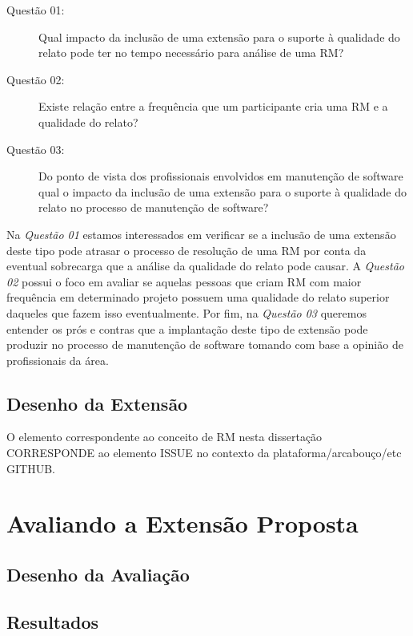 \begin{description}
	\item[Questão 01:] Qual impacto da inclusão de uma extensão para o suporte à
		qualidade do relato pode ter no tempo necessário para análise de uma
		RM\@?
	\item[Questão 02:] Existe relação entre a frequência que um participante
		cria uma RM e a qualidade do relato?
	\item[Questão 03:] Do ponto de vista dos profissionais envolvidos em
		manutenção de software qual o impacto da inclusão de uma extensão para o
		suporte à qualidade do relato no processo de manutenção de software?
\end{description}

Na \textit{Questão 01} estamos interessados em verificar se a inclusão de uma
extensão deste tipo pode atrasar o processo de resolução de uma RM por conta da
eventual sobrecarga que a análise da qualidade do relato pode causar. A
\textit{Questão 02} possui o foco em avaliar se aquelas pessoas que criam RM com
maior frequência em determinado projeto possuem uma qualidade do relato superior
daqueles que fazem isso eventualmente. Por fim, na \textit{Questão 03} queremos
entender os prós e contras que a implantação deste tipo de extensão pode
produzir no processo de manutenção de software tomando com base a opinião de
profissionais da área.

\subsection{Desenho da Extensão}
\label{sub:desenho_da_extensao}


O elemento correspondente ao conceito de RM nesta dissertação CORRESPONDE ao
elemento ISSUE no contexto da plataforma/arcabouço/etc GITHUB\@.



\section{Avaliando a Extensão Proposta}
\label{sec:avaliando_a_extensao_proposta}

\subsection{Desenho da Avaliação}
\label{sub:implementacao_extenscao_desenho_da_avaliacao}

\subsection{Resultados}
\label{sub:implementacao_extensao_avaliacao_resultados}

